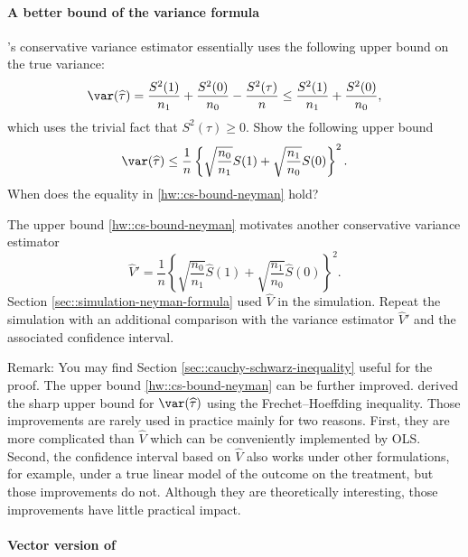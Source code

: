 \paragraph{A better bound of the variance formula}
\label{hw::better-bound-neyman}


\cite{Neyman:1923}'s conservative variance estimator essentially uses the following upper bound on the true variance:
$$
\var(\widehat{\tau}) = \frac{S^2(1)}{n_1} + \frac{S^2(0)}{n_0} - \frac{S^2(\tau)}{n} \leq \frac{S^2(1)}{n_1} + \frac{S^2(0)}{n_0},
$$
which uses the trivial fact that $S^2(\tau) \geq 0$. 
Show the following upper bound
\begin{eqnarray}\label{hw::cs-bound-neyman}
\var(\widehat{\tau})  \leq   \frac{1}{n} \left\{   \sqrt{  \frac{n_0}{n_1}  } S(1) +  \sqrt{  \frac{n_1}{n_0}  } S(0)   \right\}^2.
\end{eqnarray}
When does the equality in \eqref{hw::cs-bound-neyman} hold? 

The upper bound \eqref{hw::cs-bound-neyman} motivates another conservative variance estimator 
$$
\hat{V}' =  \frac{1}{n} \left\{   \sqrt{  \frac{n_0}{n_1}  } \hat S(1) +  \sqrt{  \frac{n_1}{n_0}  } \hat S(0)   \right\}^2.
$$
Section \ref{sec::simulation-neyman-formula} used $\hat{V}$ in the simulation. Repeat the simulation with an additional comparison with the variance estimator $\hat{V}' $ and the associated confidence interval. 



Remark: 
You may find Section \ref{sec::cauchy-schwarz-inequality} useful for the proof. 
The upper bound \eqref{hw::cs-bound-neyman} can be further improved. 
\citet{aronow2014sharp} derived the sharp upper bound for $\var(\widehat{\tau}) $ using the Frechet--Hoeffding inequality. Those improvements are rarely used in practice mainly for two reasons. First, they are more complicated than $\hat{V}$ which can be conveniently implemented by OLS. Second, the confidence interval based on  $\hat{V}$ also works under other formulations, for example, under a true linear model of the outcome on the treatment, but those improvements do not. Although they are theoretically interesting, those improvements have little practical impact. 
 


\paragraph{Vector version of \citet{Neyman:1923}} \label{hw::vector-neyman1923}

